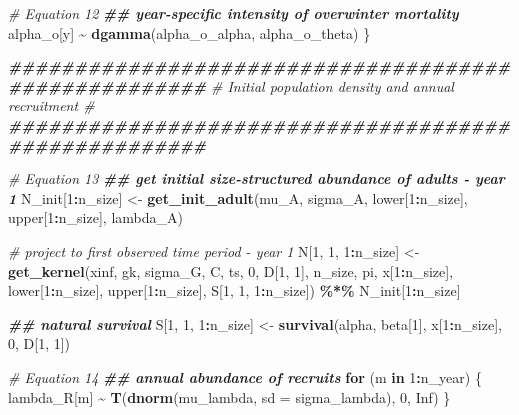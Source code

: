 \documentclass[
]{article}
\newenvironment{Shaded}{\begin{snugshade}}{\end{snugshade}}
\newcommand{\AttributeTok}[1]{\textcolor[rgb]{0.13,0.29,0.53}{#1}}
\newcommand{\CommentTok}[1]{\textcolor[rgb]{0.56,0.35,0.01}{\textit{#1}}}
\newcommand{\ConstantTok}[1]{\textcolor[rgb]{0.56,0.35,0.01}{#1}}
\newcommand{\ControlFlowTok}[1]{\textcolor[rgb]{0.13,0.29,0.53}{\textbf{#1}}}
\newcommand{\DecValTok}[1]{\textcolor[rgb]{0.00,0.00,0.81}{#1}}
\newcommand{\DocumentationTok}[1]{\textcolor[rgb]{0.56,0.35,0.01}{\textbf{\textit{#1}}}}
\newcommand{\FunctionTok}[1]{\textcolor[rgb]{0.13,0.29,0.53}{\textbf{#1}}}
\newcommand{\NormalTok}[1]{#1}
\newcommand{\OtherTok}[1]{\textcolor[rgb]{0.56,0.35,0.01}{#1}}
\newcommand{\SpecialCharTok}[1]{\textcolor[rgb]{0.81,0.36,0.00}{\textbf{#1}}}
\begin{document}
\begin{Shaded}
\begin{Highlighting}[]
    \CommentTok{\# Equation 12}
    \DocumentationTok{\#\# year{-}specific intensity of overwinter mortality}
\NormalTok{    alpha\_o[y] }\SpecialCharTok{\textasciitilde{}} \FunctionTok{dgamma}\NormalTok{(alpha\_o\_alpha, alpha\_o\_theta)}
\NormalTok{  \}}

  \DocumentationTok{\#\#\#\#\#\#\#\#\#\#\#\#\#\#\#\#\#\#\#\#\#\#\#\#\#\#\#\#\#\#\#\#\#\#\#\#\#\#\#\#\#\#\#\#\#\#\#\#\#\#\#\#\#}
  \CommentTok{\# Initial population density and annual recruitment \#}
  \DocumentationTok{\#\#\#\#\#\#\#\#\#\#\#\#\#\#\#\#\#\#\#\#\#\#\#\#\#\#\#\#\#\#\#\#\#\#\#\#\#\#\#\#\#\#\#\#\#\#\#\#\#\#\#\#\#}

  \CommentTok{\# Equation 13}
  \DocumentationTok{\#\# get initial size{-}structured abundance of adults {-} year 1}
\NormalTok{  N\_init[}\DecValTok{1}\SpecialCharTok{:}\NormalTok{n\_size] }\OtherTok{\textless{}{-}} \FunctionTok{get\_init\_adult}\NormalTok{(mu\_A, sigma\_A,}
\NormalTok{                                     lower[}\DecValTok{1}\SpecialCharTok{:}\NormalTok{n\_size], upper[}\DecValTok{1}\SpecialCharTok{:}\NormalTok{n\_size], lambda\_A)}

  \CommentTok{\# project to first observed time period {-} year 1}
\NormalTok{  N[}\DecValTok{1}\NormalTok{, }\DecValTok{1}\NormalTok{, }\DecValTok{1}\SpecialCharTok{:}\NormalTok{n\_size] }\OtherTok{\textless{}{-}} \FunctionTok{get\_kernel}\NormalTok{(xinf, gk, sigma\_G, C,}
\NormalTok{                                  ts, }\DecValTok{0}\NormalTok{, D[}\DecValTok{1}\NormalTok{, }\DecValTok{1}\NormalTok{], n\_size, pi,}
\NormalTok{                                  x[}\DecValTok{1}\SpecialCharTok{:}\NormalTok{n\_size], lower[}\DecValTok{1}\SpecialCharTok{:}\NormalTok{n\_size],}
\NormalTok{                                  upper[}\DecValTok{1}\SpecialCharTok{:}\NormalTok{n\_size], S[}\DecValTok{1}\NormalTok{, }\DecValTok{1}\NormalTok{, }\DecValTok{1}\SpecialCharTok{:}\NormalTok{n\_size]) }\SpecialCharTok{\%*\%}
\NormalTok{    N\_init[}\DecValTok{1}\SpecialCharTok{:}\NormalTok{n\_size]}

  \DocumentationTok{\#\# natural survival}
\NormalTok{  S[}\DecValTok{1}\NormalTok{, }\DecValTok{1}\NormalTok{, }\DecValTok{1}\SpecialCharTok{:}\NormalTok{n\_size] }\OtherTok{\textless{}{-}} \FunctionTok{survival}\NormalTok{(alpha, beta[}\DecValTok{1}\NormalTok{], x[}\DecValTok{1}\SpecialCharTok{:}\NormalTok{n\_size], }\DecValTok{0}\NormalTok{, D[}\DecValTok{1}\NormalTok{, }\DecValTok{1}\NormalTok{])}

  \CommentTok{\# Equation 14}
  \DocumentationTok{\#\# annual abundance of recruits}
  \ControlFlowTok{for}\NormalTok{ (m }\ControlFlowTok{in} \DecValTok{1}\SpecialCharTok{:}\NormalTok{n\_year) \{}
\NormalTok{    lambda\_R[m] }\SpecialCharTok{\textasciitilde{}} \FunctionTok{T}\NormalTok{(}\FunctionTok{dnorm}\NormalTok{(mu\_lambda, }\AttributeTok{sd =}\NormalTok{ sigma\_lambda), }\DecValTok{0}\NormalTok{, }\ConstantTok{Inf}\NormalTok{)}
\NormalTok{  \}}


\end{Highlighting}
\end{Shaded}
\end{document}
